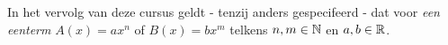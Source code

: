 \documentclass{ximera}
\begin{document}















\begin{notation}

	In het vervolg van deze cursus geldt - tenzij anders gespecifeerd - dat voor \textit{ een eenterm} \(A(x) = ax^n\) of \(B(x) = bx^m\) telkens \(n,m\in \mathbb{N}\) en \(a,b\in \mathbb{R}\).
\end{notation}
	
\end{document}
